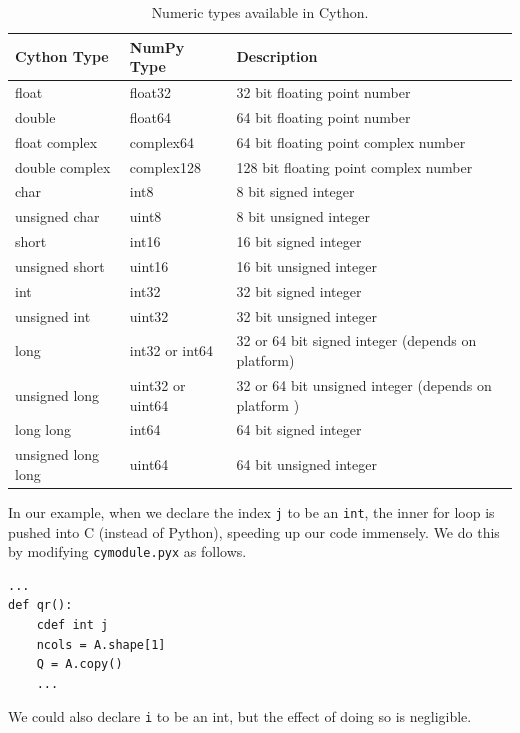\begin{table}
\begin{center}
\begin{tabular}{|p{2.8cm}|p{2.5cm}|p{6cm}|}
\hline
Cython Type & NumPy Type& Description \\
\hline
float & float32 & 32 bit floating point number \\
double & float64 & 64 bit floating point number \\
float complex & complex64 & 64 bit floating point complex number \\
double complex & complex128 & 128 bit floating point complex number \\
char & int8 & 8 bit signed integer \\
unsigned char & uint8 & 8 bit unsigned integer \\
short & int16 & 16 bit signed integer \\
unsigned short & uint16 & 16 bit unsigned integer \\
int & int32 & 32 bit signed integer \\
unsigned int & uint32 & 32 bit unsigned integer \\
long & int32 or int64 & 32 or 64 bit signed integer (depends on platform) \\
unsigned long & uint32 or uint64 & 32 or 64 bit unsigned integer (depends on platform ) \\
long long & int64 & 64 bit signed integer \\
unsigned long long & uint64 & 64 bit unsigned integer \\
\hline
\end{tabular}
\end{center}
\caption{Numeric types available in Cython.}
\label{table:cython_types}
\end{table}

In our example, when we declare the index \texttt{j} to be an \texttt{int}, the inner for loop is pushed into C (instead of Python), speeding up our code immensely.
We do this by modifying \texttt{cymodule.pyx} as follows.
\begin{lstlisting}
...
def qr():
    cdef int j
    ncols = A.shape[1]
    Q = A.copy()
    ...
\end{lstlisting}

We could also declare \texttt{i} to be an int, but the effect of doing so is negligible.

